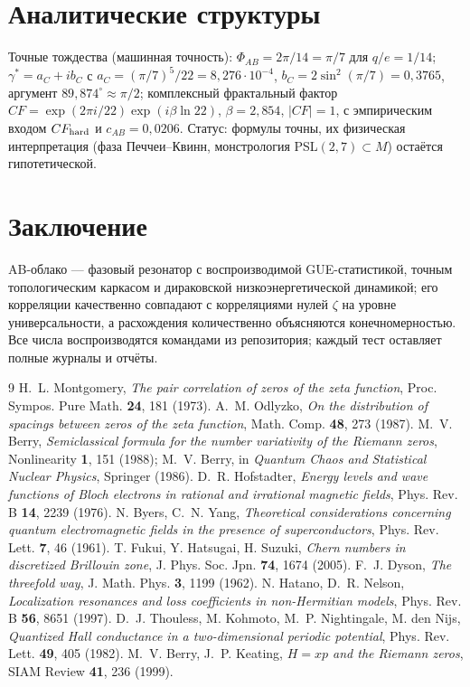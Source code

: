 \documentclass[11pt,a4paper]{article}
\begin{document}
\section{Аналитические структуры}
Точные тождества (машинная точность): $\Phi_{AB}=2\pi/14=\pi/7$ для $q/e=1/14$; $\gamma^\ast=a_C+ib_C$ с $a_C=(\pi/7)^5/22=8{,}276\cdot10^{-4}$, $b_C=2\sin^2(\pi/7)=0{,}3765$, аргумент $89{,}874^\circ\approx\pi/2$; комплексный фрактальный фактор $CF=\exp(2\pi i/22)\exp(i\beta\ln22)$, $\beta=2{,}854$, $|CF|=1$, с эмпирическим входом $CF_{\rm hard}$ и $c_{AB}=0{,}0206$. Статус: формулы точны, их физическая интерпретация (фаза Печчеи--Квинн, монстрология PSL$(2,7)\subset M$) остаётся гипотетической.

\section{Заключение}
AB-облако --- фазовый резонатор с воспроизводимой GUE-статистикой, точным топологическим каркасом и дираковской низкоэнергетической динамикой; его корреляции качественно совпадают с корреляциями нулей $\zeta$ на уровне универсальности, а расхождения количественно объясняются конечномерностью. Все числа воспроизводятся командами из репозитория; каждый тест оставляет полные журналы и отчёты.

\begin{thebibliography}{9}
 H.~L. Montgomery, \emph{The pair correlation of zeros of the zeta function}, Proc. Sympos. Pure Math. \textbf{24}, 181 (1973).
 A.~M. Odlyzko, \emph{On the distribution of spacings between zeros of the zeta function}, Math. Comp. \textbf{48}, 273 (1987).
 M.~V. Berry, \emph{Semiclassical formula for the number variativity of the Riemann zeros}, Nonlinearity \textbf{1}, 151 (1988); M.~V. Berry, in \emph{Quantum Chaos and Statistical Nuclear Physics}, Springer (1986).
 D.~R. Hofstadter, \emph{Energy levels and wave functions of Bloch electrons in rational and irrational magnetic fields}, Phys. Rev. B \textbf{14}, 2239 (1976).
 N. Byers, C.~N. Yang, \emph{Theoretical considerations concerning quantum electromagnetic fields in the presence of superconductors}, Phys. Rev. Lett. \textbf{7}, 46 (1961).
 T. Fukui, Y. Hatsugai, H. Suzuki, \emph{Chern numbers in discretized Brillouin zone}, J. Phys. Soc. Jpn. \textbf{74}, 1674 (2005).
 F.~J. Dyson, \emph{The threefold way}, J. Math. Phys. \textbf{3}, 1199 (1962).
 N. Hatano, D.~R. Nelson, \emph{Localization resonances and loss coefficients in non-Hermitian models}, Phys. Rev. B \textbf{56}, 8651 (1997).
 D.~J. Thouless, M. Kohmoto, M.~P. Nightingale, M. den Nijs, \emph{Quantized Hall conductance in a two-dimensional periodic potential}, Phys. Rev. Lett. \textbf{49}, 405 (1982).
 M.~V. Berry, J.~P. Keating, \emph{$H=xp$ and the Riemann zeros}, SIAM Review \textbf{41}, 236 (1999).
\end{thebibliography}
\end{document}
